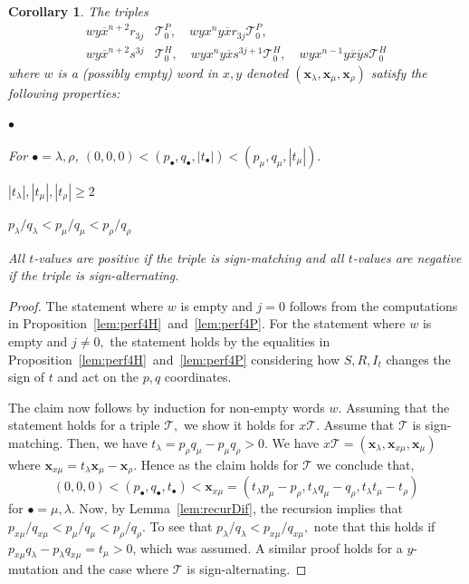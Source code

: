 \documentclass[11pt, reqno]{amsart}
\newtheorem{cor}[thm]{Corollary}
\theoremstyle{remark}
\numberwithin{equation}{subsection}
\numberwithin{figure}{section}
\theoremstyle{customremark}
\newcommand{\Tt}{\mathcal{T}}
\newenvironment{itemlist}
   { \begin{list} {$\bullet$}
         { \setlength{\topsep}{.5ex}  \setlength{\itemsep}{.5ex} \setlength{\leftmargin}{2.5ex} } }
   { \end{list} }
\newcommand{\ov}{\overline}
\newcommand{\la}{{\lambda}}
\begin{document}
\begin{cor} \label{cor:triples}
    The triples \begin{align*} wy\ov{x}^{n+2}r_{3j}&\Tt_0^P, \quad wyx^ny\ov{x}r_{3j}\Tt_0^P,\\
wy\ov{x}^{n+2}s^{3j}&\Tt_0^H,\quad wyx^ny\ov{x}s^{3j+1}\Tt_0^H, \quad wyx^{n-1}y\ov{x}\ov{y}s\Tt_0^H
    \end{align*}
    where $w$ is a (possibly empty) word in $x,y$ denoted $(\bm{x}_\la,\bm{x}_\mu,\bm{x}_\rho)$ satisfy the following properties: 
    \begin{itemlist}
        \item[{(i)}] For $\bullet=\la,\rho$, 
$(0,0,0)<(p_\bullet,q_\bullet,|t_\bullet|)<(p_\mu,q_\mu,|t_\mu|).$
        \item[{(ii)}] $|t_\la|,|t_\mu|,|t_\rho|\geq 2$
        \item[{(iii)}] $p_\la/q_\la < p_\mu/q_\mu <p_\rho/q_\rho$
        \item[{(iv)}] All $t$-values are positive if the triple is sign-matching and all $t$-values are negative if the triple is sign-alternating.
    \end{itemlist}
\end{cor}
\begin{proof}
    The statement where $w$ is empty and $j=0$ follows from the computations in Proposition~\ref{lem:perf4H}~and~\ref{lem:perf4P}. For the statement where $w$ is empty and $j \neq 0,$ the statement holds by the equalities in Proposition~\ref{lem:perf4H}~and~\ref{lem:perf4P} considering how $S,R,I_t$ changes the sign of $t$ and act on the $p,q$ coordinates. 

    The claim now follows by induction for non-empty words $w.$ Assuming that the statement holds for a triple $\Tt,$ we show it holds for $x\Tt$. Assume that $\Tt$ is sign-matching. Then, we have $t_\la=p_\rho q_\mu-p_\mu q_\rho>0.$
    We have $x\Tt=(\bm{x}_\la,\bm{x}_{x\mu},\bm{x}_\mu)$ where $\bm{x}_{x\mu}=t_\la\bm{x}_{\mu}-\bm{x}_\rho.$ Hence as the claim holds for $\Tt$ we conclude that, \[(0,0,0)<(p_\bullet,q_\bullet,t_\bullet)<\bm{x}_{x\mu}=(t_\la p_{\mu}-p_\rho,t_\la q_\mu-q_\rho,t_\la t_\mu-t_\rho)\] for $\bullet=\mu,\la$. Now, by Lemma~\ref{lem:recurDif}, the recursion implies that $p_{x\mu}/q_{x\mu}<p_\mu/q_\mu<p_\rho/q_\rho.$ To see that $p_\la/q_\la<p_{x\mu}/q_{x\mu},$ note that this holds if $p_{x\mu}q_\la-p_\la q_{x\mu}=t_\mu>0$, which was assumed. A similar proof holds for a $y$-mutation and the case where $\Tt$ is sign-alternating. 
\end{proof}
\end{document}
